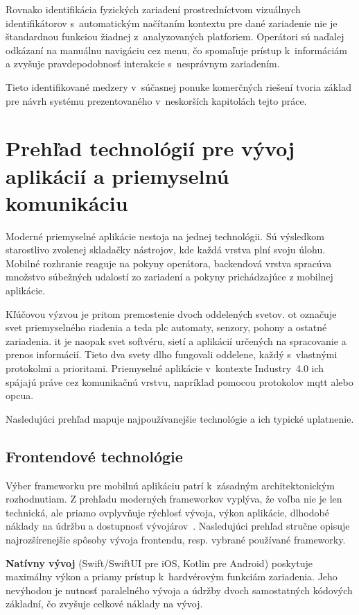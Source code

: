 Rovnako identifikácia fyzických zariadení prostredníctvom vizuálnych
identifikátorov s~automatickým načítaním kontextu pre dané zariadenie nie je
štandardnou funkciou žiadnej z~analyzovaných platforiem. Operátori sú naďalej
odkázaní na manuálnu navigáciu cez menu, čo spomaľuje prístup k~informáciám a
zvyšuje pravdepodobnosť interakcie s~nesprávnym zariadením.

Tieto identifikované medzery v~súčasnej ponuke komerčných riešení tvoria základ
pre návrh systému prezentovaného v~neskorších kapitolách tejto práce.

\section{Prehľad technológií pre vývoj aplikácií a priemyselnú komunikáciu}

Moderné priemyselné aplikácie nestoja na jednej technológii. Sú výsledkom
starostlivo zvolenej skladačky nástrojov, kde každá vrstva plní svoju úlohu.
Mobilné rozhranie reaguje na pokyny operátora, backendová vrstva spracúva
množstvo súbežných udalostí zo zariadení a pokyny prichádzajúce z mobilnej
aplikácie.

Kľúčovou výzvou je pritom premostenie dvoch oddelených svetov. \acrshort{ot}
označuje svet priemyselného riadenia a teda \acrshort{plc} automaty, senzory,
pohony a ostatné zariadenia. \acrshort{it} je naopak svet softvéru, sietí a
aplikácií určených na spracovanie a prenos informácií. Tieto dva svety dlho
fungovali oddelene, každý s~vlastnými protokolmi a prioritami. Priemyselné
aplikácie v~kontexte Industry~4.0 ich spájajú práve cez
komunikačnú vrstvu, napríklad pomocou protokolov \acrshort{mqtt} alebo
\acrshort{opcua}.

Nasledujúci prehľad mapuje najpoužívanejšie technológie a ich typické
uplatnenie.

\subsection{Frontendové technológie}

Výber frameworku pre mobilnú aplikáciu patrí k~zásadným architektonickým
rozhodnutiam. Z prehľadu moderných frameworkov vyplýva, že voľba nie je len
technická, ale priamo ovplyvňuje rýchlosť vývoja, výkon aplikácie, dlhodobé
náklady na údržbu a dostupnosť vývojárov~\cite{t08}. Nasledujúci prehľad
stručne opisuje najrozšírenejšie spôsoby vývoja frontendu, resp. vybrané
používané frameworky.

\textbf{Natívny vývoj} (Swift/SwiftUI pre iOS, Kotlin pre Android) poskytuje
maximálny výkon a priamy prístup k~hardvérovým funkciám zariadenia. Jeho
nevýhodou je nutnosť paralelného vývoja a údržby dvoch samostatných kódových
základní, čo zvyšuje celkové náklady na vývoj.

